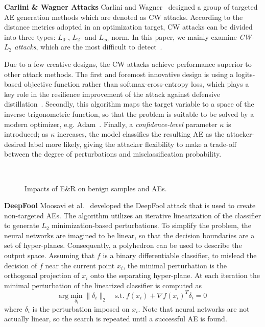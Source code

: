 \documentclass[sigconf]{acmart}
\begin{document}
\vspace{3pt}
\noindent \textbf{Carlini \& Wagner Attacks}
Carlini and Wagner~\cite{carlini2017towards} designed a group of targeted AE generation methods which are denoted as CW attacks. According to the distance metrics adopted in an optimization target, CW attacks can be divided into three types: $L_0$-, $L_2$- and $L_{\infty}$-norm. In this paper, we mainly examine \emph{CW-$L_2$ attacks}, which are the most difficult to detect~\cite{he2017adversarial,carlini2017adversarial}.  

Due to a few creative designs, the CW attacks achieve  performance superior to other attack methods.
The first and foremost innovative design is using a logits-based objective function rather than softmax-cross-entropy loss, which plays a key role in the resilience improvement of the attack against 
defensive distillation~\cite{papernot2015distillation}.
Secondly, this algorithm maps the target variable to a space of the inverse trigonometric function, so that the problem is suitable to be solved by a modern optimizer, e.g. Adam~\cite{kingma2014adam}. Finally, a \emph{confidence-level} parameter $\kappa$ 
is introduced; as $\kappa$ increases, the model classifies the resulting AE as the attacker-desired label more likely,  giving the attacker
flexibility to make a trade-off between the degree of perturbations and misclassification probability.

\begin{figure*} [!thb]
\centering

\ \ 
\caption{Impacts of E\&R on benign samples and AEs.}\label{fig_sensitive}
\end{figure*}

\vspace{3pt}
\noindent \textbf{DeepFool} \label{sec:deepfool}
Moosavi et al.~\cite{moosavi2016deepfool} developed the DeepFool attack that is used to create non-targeted AEs. The algorithm utilizes an iterative linearization of the classifier to generate $L_2$ minimization-based perturbations. To simplify the problem, the neural networks are imagined to be linear, so that the decision boundaries are a set of hyper-planes. Consequently, a polyhedron can be used to describe the output space. Assuming that $f$ is a binary differentiable classifier, to mislead the decision of $f$ near the current point $x_i$, the minimal perturbation is the orthogonal projection of $x_i$ onto the separating hyper-plane. At each iteration the minimal perturbation of the linearized classifier is computed as
\begin{equation}
    \mathrm{arg}\min\limits_{\delta_i}\|\delta_i\|_2\quad \mathrm{s.t.}\  f(x_i)+\nabla f(x_i)^T{\delta_i}=0
\end{equation}
where $\delta_i$ is the perturbation imposed on $x_i$. Note that neural networks are not actually linear, so the search is repeated until a successful AE is found. 
\end{document}
